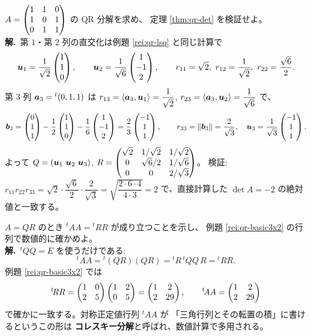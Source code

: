 \begin{rei}\label{rei:qr-3x3}
$A = \begin{pmatrix}1 & 1 & 0 \\ 1 & 0 & 1 \\ 0 & 1 & 1\end{pmatrix}$ の QR 分解を求め、
定理 \ref{thm:qr-det} を検証せよ。\\
\textbf{解.}\ 第 $1$・第 $2$ 列の直交化は例題 \ref{rei:qr-lsq} と同じ計算で
\[
\bm{u}_1 = \frac{1}{\sqrt{2}}\begin{pmatrix}1 \\ 1 \\ 0\end{pmatrix}, \qquad
\bm{u}_2 = \frac{1}{\sqrt{6}}\begin{pmatrix}1 \\ -1 \\ 2\end{pmatrix}, \qquad
r_{11} = \sqrt{2},\ r_{12} = \frac{1}{\sqrt{2}},\ r_{22} = \frac{\sqrt{6}}{2}.
\]
第 $3$ 列 $\bm{a}_3 = {}^t(0, 1, 1)$ は
$r_{13} = \langle \bm{a}_3, \bm{u}_1 \rangle = \dfrac{1}{\sqrt{2}}$,
$r_{23} = \langle \bm{a}_3, \bm{u}_2 \rangle = \dfrac{1}{\sqrt{6}}$ で、
\[
\bm{b}_3 = \begin{pmatrix}0 \\ 1 \\ 1\end{pmatrix} - \frac{1}{2}\begin{pmatrix}1 \\ 1 \\ 0\end{pmatrix}
- \frac{1}{6}\begin{pmatrix}1 \\ -1 \\ 2\end{pmatrix} = \frac{2}{3}\begin{pmatrix}-1 \\ 1 \\ 1\end{pmatrix},
\qquad r_{33} = \|\bm{b}_3\| = \frac{2}{\sqrt{3}}, \quad
\bm{u}_3 = \frac{1}{\sqrt{3}}\begin{pmatrix}-1 \\ 1 \\ 1\end{pmatrix}.
\]
よって $Q = (\bm{u}_1\ \bm{u}_2\ \bm{u}_3)$,
$R = \begin{pmatrix}\sqrt{2} & 1/\sqrt{2} & 1/\sqrt{2} \\
0 & \sqrt{6}/2 & 1/\sqrt{6} \\ 0 & 0 & 2/\sqrt{3}\end{pmatrix}$。
検証:$r_{11}r_{22}r_{33} = \sqrt{2} \cdot \dfrac{\sqrt{6}}{2}
\cdot \dfrac{2}{\sqrt{3}} = \sqrt{\dfrac{2 \cdot 6 \cdot 4}{4 \cdot 3}} = 2$
で、直接計算した $\det A = -2$ の絶対値と一致する。
\end{rei}

\begin{rei}[例題・標準(${}^t\!AA = {}^t\!RR$)]\label{rei:qr-cholesky}
$A = QR$ のとき ${}^t\!AA = {}^t\!RR$ が成り立つことを示し、
例題 \ref{rei:qr-basic3x2} の行列で数値的に確かめよ。\\
\textbf{解.}\ ${}^t\!QQ = E$ を使うだけである:
\[
{}^t\!AA = {}^t\!(QR)(QR) = {}^t\!R\,{}^t\!QQ\,R = {}^t\!RR.
\]
例題 \ref{rei:qr-basic3x2} では
\[
{}^t\!RR = \begin{pmatrix}1 & 0 \\ 2 & 5\end{pmatrix}\begin{pmatrix}1 & 2 \\ 0 & 5\end{pmatrix}
= \begin{pmatrix}1 & 2 \\ 2 & 29\end{pmatrix}, \qquad
{}^t\!AA = \begin{pmatrix}1 & 2 \\ 2 & 29\end{pmatrix}
\]
で確かに一致する。対称正定値行列 ${}^t\!AA$ が
「三角行列とその転置の積」に書けるというこの形は
\textbf{コレスキー分解}と呼ばれ、数値計算で多用される。
\end{rei}

